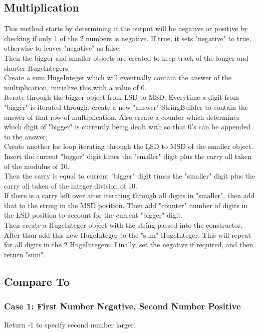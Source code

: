 \documentclass[12pt, letterpaper, titlepage, hidelinks]{article}
\begin{document}
	\subsection{Multiplication}
	\label{section:multiply}
		This method starts by determining if the output will be negative or positive by checking if only 1 of the 2 numbers is negative. If true, it sets "negative" to true, otherwise to leaves "negative" as false.\\
		Then the bigger and smaller objects are created to keep track of the longer and shorter HugeIntegers.\\
		Create a sum HugeInteger which will eventually contain the answer of the multiplication, initialize this with a value of 0.\\
		Iterate through the bigger object from LSD to MSD. Everytime a digit from "bigger" is iterated through, create a new "answer" StringBuilder to contain the answer of that row of multiplication. Also create a counter which determines which digit of "bigger" is currently being dealt with so that 0's can be appended to the answer.\\
		Create another for loop iterating through the LSD to MSD of the smaller object.\\
		Insert the current "bigger" digit times the "smaller" digit plus the carry all taken of the modulus of 10.\\
		Then the carry is equal to current "bigger" digit times the "smaller" digit plus the carry all taken of the integer division of 10.\\
		If there is a carry left over after iterating through all digits in "smaller", then add that to the string in the MSD position. Then add "counter" number of digits in the LSD position to account for the current "bigger" digit.\\
		Then create a HugeInteger object with the string passed into the constructor.\\
		After than add this new HugeInteger to the "sum" HugeInteger. This will repeat for all digits in the 2 HugeIntegers.
		Finally, set the negative if required, and then return "sum".
	\subsection{Compare To}
	\label{section:compare}
		\subsubsection{Case 1: First Number Negative, Second Number Positive}
			Return -1 to specify second number larger.
\end{document}
